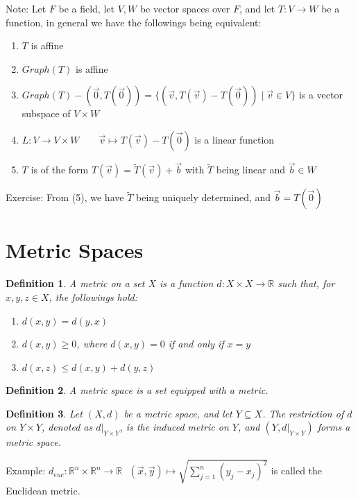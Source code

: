 \documentclass[11pt,oneside]{book}
\theoremstyle{break}
\theoremstyle{break}
\newtheorem{defn}{Definition}[corL]
\newcommand{\R}{\mathbb{R}}
\newcommand{\note}{\color{red}Note: \color{black}}
\newcommand{\example}{\color{green}Example: \color{black}}
\newcommand{\exercise}{\color{green}Exercise: \color{black}}
\begin{document}
\hfill\break
\note Let $F$ be a field, let $V,W$ be vector spaces over $F$, and let $T:V\to W$ be a function, in general we have the followings being equivalent:
\begin{enumerate}[topsep=3pt,itemsep=-1ex,partopsep=1ex,parsep=1ex]
\item $T$ is affine
\item $Graph(T)$ is affine
\item $Graph(T)-(\vec{0},T(\vec{0})) = \{(\vec{v},T(\vec{v})-T(\vec{0}))\mid \vec{v}\in V\}$ is a vector subspace of $V \times W$
\item $L:V\to V\times W \qquad \vec{v}\mapsto T(\vec{v})-T(\vec{0})$ is a linear function
\item $T$ is of the form $T(\vec{v}) = \widetilde{T}(\vec{v})+\vec{b}$ with $\widetilde{T}$ being linear and $\vec{b}\in W$
\end{enumerate}

\exercise From (5), we have $\widetilde{T}$ being uniquely determined, and $\vec{b} = T(\vec{0})$
\newpage

\section[Metric Spaces]{\color{red}Metric Spaces\color{black}}

\begin{defn}
A metric on a set $X$ is a function $d:X \times X \to \R$ such that, for $x,y,z\in X$, the followings hold:
\begin{enumerate}[topsep=3pt,itemsep=-1ex,partopsep=1ex,parsep=1ex]
\item $d(x,y) = d(y,x)$
\item $d(x,y)\geq 0$, where $d(x,y) = 0$ if and only if $x=y$
\item $d(x,z) \leq d(x,y)+d(y,z)$
\end{enumerate}
\end{defn}

\begin{defn}
A metric space is a set equipped with a metric.
\end{defn}

\begin{defn}
Let $(X,d)$ be a metric space, and let $Y\subseteq X$. The restriction of $d$ on $Y\times Y$, denoted as $d|_{Y\times Y}$, is the induced metric on $Y$, and $(Y,d|_{Y\times Y})$ forms a metric space.
\end{defn}


\example $d_{euc}:\R^n\times \R^n\to \R \ \ \ (\vec{x},\vec{y}) \mapsto \sqrt{\sum_{j=1}^n(y_j-x_j)^2}$ is called the Euclidean metric.
\end{document}
